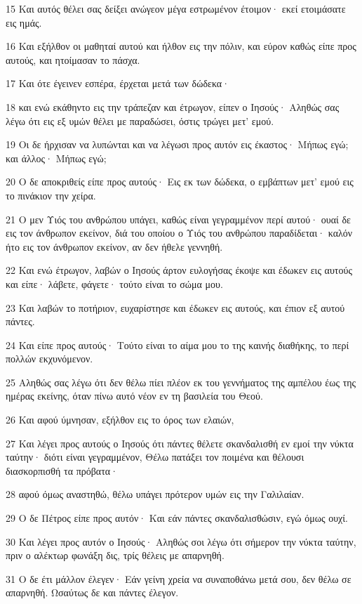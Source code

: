 \par 15 Και αυτός θέλει σας δείξει ανώγεον μέγα εστρωμένον έτοιμον· εκεί ετοιμάσατε εις ημάς.
\par 16 Και εξήλθον οι μαθηταί αυτού και ήλθον εις την πόλιν, και εύρον καθώς είπε προς αυτούς, και ητοίμασαν το πάσχα.
\par 17 Και ότε έγεινεν εσπέρα, έρχεται μετά των δώδεκα·
\par 18 και ενώ εκάθηντο εις την τράπεζαν και έτρωγον, είπεν ο Ιησούς· Αληθώς σας λέγω ότι εις εξ υμών θέλει με παραδώσει, όστις τρώγει μετ' εμού.
\par 19 Οι δε ήρχισαν να λυπώνται και να λέγωσι προς αυτόν εις έκαστος· Μήπως εγώ; και άλλος· Μήπως εγώ;
\par 20 Ο δε αποκριθείς είπε προς αυτούς· Εις εκ των δώδεκα, ο εμβάπτων μετ' εμού εις το πινάκιον την χείρα.
\par 21 Ο μεν Υιός του ανθρώπου υπάγει, καθώς είναι γεγραμμένον περί αυτού· ουαί δε εις τον άνθρωπον εκείνον, διά του οποίου ο Υιός του ανθρώπου παραδίδεται· καλόν ήτο εις τον άνθρωπον εκείνον, αν δεν ήθελε γεννηθή.
\par 22 Και ενώ έτρωγον, λαβών ο Ιησούς άρτον ευλογήσας έκοψε και έδωκεν εις αυτούς και είπε· λάβετε, φάγετε· τούτο είναι το σώμα μου.
\par 23 Και λαβών το ποτήριον, ευχαρίστησε και έδωκεν εις αυτούς, και έπιον εξ αυτού πάντες.
\par 24 Και είπε προς αυτούς· Τούτο είναι το αίμα μου το της καινής διαθήκης, το περί πολλών εκχυνόμενον.
\par 25 Αληθώς σας λέγω ότι δεν θέλω πίει πλέον εκ του γεννήματος της αμπέλου έως της ημέρας εκείνης, όταν πίνω αυτό νέον εν τη βασιλεία του Θεού.
\par 26 Και αφού ύμνησαν, εξήλθον εις το όρος των ελαιών,
\par 27 Και λέγει προς αυτούς ο Ιησούς ότι πάντες θέλετε σκανδαλισθή εν εμοί την νύκτα ταύτην· διότι είναι γεγραμμένον, Θέλω πατάξει τον ποιμένα και θέλουσι διασκορπισθή τα πρόβατα·
\par 28 αφού όμως αναστηθώ, θέλω υπάγει πρότερον υμών εις την Γαλιλαίαν.
\par 29 Ο δε Πέτρος είπε προς αυτόν· Και εάν πάντες σκανδαλισθώσιν, εγώ όμως ουχί.
\par 30 Και λέγει προς αυτόν ο Ιησούς· Αληθώς σοι λέγω ότι σήμερον την νύκτα ταύτην, πριν ο αλέκτωρ φωνάξη δις, τρίς θέλεις με απαρνηθή.
\par 31 Ο δε έτι μάλλον έλεγεν· Εάν γείνη χρεία να συναποθάνω μετά σου, δεν θέλω σε απαρνηθή. Ωσαύτως δε και πάντες έλεγον.
